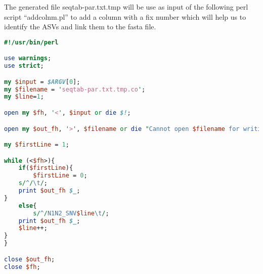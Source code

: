 \documentclass{article}
\begin{document}
The generated file seqtab-par.txt.tmp will be use as input of the following perl script “addcolnm.pl” to add a column with a fix number which will help us to identify the ASVs and link them to the fasta file.

\begin{lstlisting}[language=perl,caption={addcolnm.pl}]
#!/usr/bin/perl

use warnings;
use strict;

my $input = $ARGV[0];
my $filename = 'seqtab-par.txt.tmp.co';
my $line=1;

open my $fh, '<', $input or die $!;

open my $out_fh, '>', $filename or die "Cannot open $filename for writing: $!";

my $firstLine = 1;

while (<$fh>){
    if($firstLine){
        $firstLine = 0;
	s/^/\t/;
	print $out_fh $_;    
}
    else{
        s/^/N1N2_SNV$line\t/;
	print $out_fh $_;
	$line++;
} 
}

close $out_fh;
close $fh;
\end{lstlisting}
\end{document}

